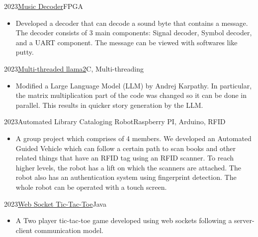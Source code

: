 \documentclass{cv}
\begin{document}
    \begin{project}{2023}{\href{https://github.com/Nepranal/musicdecoder}{Music Decoder}}{FPGA}
        \begin{itemize}
    	    \item Developed a decoder that can decode a sound byte that contains a message. The decoder consists of 3 main components: Signal decoder, Symbol decoder, and a UART component. The message can be viewed with softwares like putty.
        \end{itemize}
	\end{project}

    \begin{project}{2023}{\href{https://github.com/Nepranal/multithreaded-llama2}{Multi-threaded llama2}}{C, Multi-threading}
        \begin{itemize}
    	    \item Modified a Large Language Model (LLM) by Andrej Karpathy. In particular, the matrix multiplication part of the code was changed so it can be done in parallel. This results in quicker story generation by the LLM.
        \end{itemize}
	\end{project}

    \begin{project}{2023}{Automated Library Cataloging Robot}{Raspberry PI, Arduino, RFID}
        \begin{itemize}
    	    \item A group project which comprises of 4 members. We developed an Automated Guided Vehicle which can follow a certain path to scan books and other related things that have an RFID tag using an RFID scanner. To reach higher levels, the robot has a lift on which the scanners are attached. The robot also has an authentication system using fingerprint detection. The whole robot can be operated with a touch screen.
        \end{itemize}
	\end{project}

    \begin{project}{2023}{\href{https://github.com/Nepranal/tic-tac-toe}{Web Socket Tic-Tac-Toe}}{Java}
        \begin{itemize}
    	    \item A Two player tic-tac-toe game developed using web sockets following a server-client communication model.
        \end{itemize}
	\end{project}
    \vspace{0.2in}
	
\end{document}
